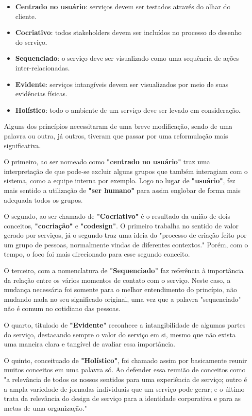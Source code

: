 \begin{itemize}
	\item \textbf{Centrado no usuário}: serviços devem ser testados através do olhar do cliente.
	\item \textbf{Cocriativo}: todos stakeholders devem ser incluídos no processo do desenho do serviço.
	\item \textbf{Sequenciado}: o serviço deve ser visualizado como uma sequência de ações inter-relacionadas.
	\item \textbf{Evidente}: serviços intangíveis devem ser visualizados por meio de suas evidências físicas.
	\item \textbf{Holístico}: todo o ambiente de um serviço deve ser levado em consideração.
\end{itemize}
	
Alguns dos princípios necessitaram de uma breve modificação, sendo de uma palavra ou outra, já outros, tiveram que passar por uma reformulação mais significativa.

O primeiro, ao ser nomeado como \textbf{"centrado no usuário"} traz uma interpretação de que pode-se excluir alguns grupos que também interagiam com o sistema, como a equipe interna por exemplo. Logo no lugar de \textbf{"usuário"}, fez mais sentido a utilização de \textbf{"ser humano"} para assim englobar de forma mais adequada todos os grupos.

O segundo, ao ser chamado de \textbf{"Cocriativo"} é o resultado da união de dois conceitos, \textbf{"cocriação"} e \textbf{"codesign"}. O primeiro trabalha no sentido de valor gerado por serviços, já o segundo traz uma ideia do "processo de criação feito por um grupo de pessoas, normalmente vindas de diferentes contextos."\cite{Stickdorn2019} Porém, com o tempo, o foco foi mais direcionado para esse segundo conceito.

O terceiro, com a nomenclatura de \textbf{"Sequenciado"} faz referência à importância da relação entre os vários momentos de contato com o serviço. Neste caso, a mudança necessária foi somente para o melhor entendimento do princípio, não mudando nada no seu significado original, uma vez que a palavra "sequenciado" não é comum no cotidiano das pessoas. 

O quarto, titulado de \textbf{"Evidente"} reconhece a intangibilidade de algumas partes do serviço, destacando sempre o valor do serviço em si, mesmo que não exista uma maneira clara e tangível de avaliar essa importância.

O quinto, conceituado de \textbf{"Holístico"}, foi chamado assim por basicamente reunir muitos conceitos em uma palavra só. Ao defender essa reunião de conceitos como "a relevância de todos os nossos sentidos para uma experiência de serviço; outro é a ampla variedade de jornadas individuais que um serviço pode gerar; e o último trata da relevância do design de serviço para a identidade corporativa e para as metas de uma organização."\cite{Stickdorn2019} 

